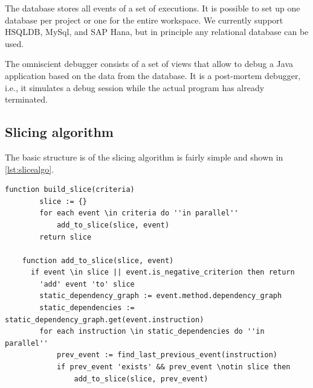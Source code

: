 ﻿\documentclass[
      english,
      ]{llncs}
\begin{document}
The database stores all events of a set of executions.
It is possible to set up one database per project or one for the entire workspace.
We currently support HSQLDB, MySql, and SAP Hana, but in principle any relational database can be used.

The omniscient debugger consists of a set of views that allow to debug a Java application based on the data from the database.
It is a post-mortem debugger, i.e., it simulates a debug session while the actual program has already terminated.

\subsection{Slicing algorithm}

The basic structure is of the slicing algorithm is fairly simple and shown in \cref{lst:slicealgo}.

\begin{lstlisting}[numberfirstline=true,float,language=algorithm,firstnumber=1,label=lst:slicealgo,caption={Example program with a failing test case}]
	function build_slice(criteria)
		slice := {}
		for each event \in criteria do ''in parallel''
			add_to_slice(slice, event)
		return slice
		
	function add_to_slice(slice, event)
	  if event \in slice || event.is_negative_criterion then return
		'add' event 'to' slice
		static_dependency_graph := event.method.dependency_graph
		static_dependencies := static_dependency_graph.get(event.instruction)
		for each instruction \in static_dependencies do ''in parallel''
			prev_event := find_last_previous_event(instruction)
			if prev_event 'exists' && prev_event \notin slice then
				add_to_slice(slice, prev_event)
\end{lstlisting}

\end{document}
